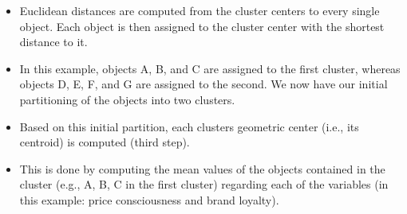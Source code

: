 \documentclass[a4paper,12pt]{article}
\begin{document}
\begin{itemize}
\item Euclidean distances are computed from the cluster
centers to every single object. Each object is then assigned to the cluster center with
the shortest distance to it.

\item In this example, objects A, B, and C are
assigned to the first cluster, whereas objects D, E, F, and G are assigned to the
second. We now have our initial partitioning of the objects into two clusters.
\item Based on this initial partition, each clusters geometric center (i.e., its centroid)
is computed (third step). 
\item This is done by computing the mean values of the objects
contained in the cluster (e.g., A, B, C in the first cluster) regarding each of the variables
(in this example: price consciousness and brand loyalty).
\end{itemize}
\end{document}
